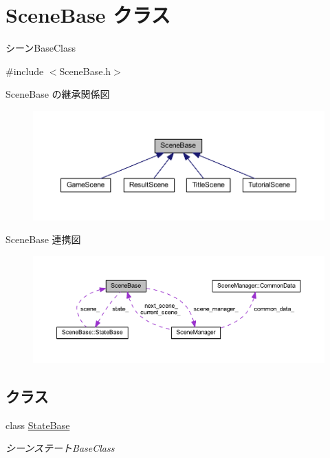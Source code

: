 \hypertarget{class_scene_base}{}\section{Scene\+Base クラス}
\label{class_scene_base}


シーン\+Base\+Class  




{\ttfamily \#include $<$Scene\+Base.\+h$>$}



Scene\+Base の継承関係図
\nopagebreak
\begin{figure}[H]
\begin{center}
\leavevmode
\includegraphics[width=350pt]{class_scene_base__inherit__graph}
\end{center}
\end{figure}


Scene\+Base 連携図
\nopagebreak
\begin{figure}[H]
\begin{center}
\leavevmode
\includegraphics[width=350pt]{class_scene_base__coll__graph}
\end{center}
\end{figure}
\subsection*{クラス}
\begin{DoxyCompactItemize}
\item 
class \mbox{\hyperlink{class_scene_base_1_1_state_base}{State\+Base}}
\begin{DoxyCompactList}\small\item\em シーンステート\+Base\+Class \end{DoxyCompactList}\end{DoxyCompactItemize}

